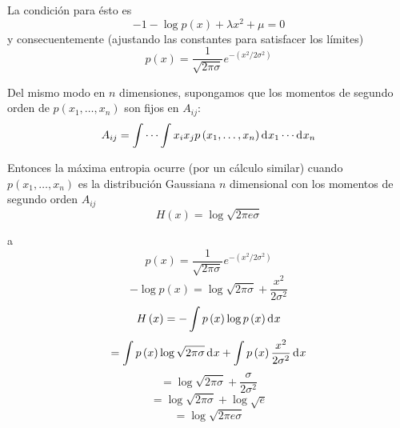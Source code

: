 La condici\'{o}n para \'{e}sto es
\begin{equation}
-1-\log p\left ( x \right )+\lambda x^{2}+\mu =0
\end{equation}
y consecuentemente (ajustando las constantes para satisfacer los l\'{i}mites)
\begin{equation}
p\left ( x \right )=\frac{1}{\sqrt{2\pi \sigma }}e^{-\left ( x^{2}/2\sigma ^{2} \right )}
\end{equation}

Del mismo modo en $n$ dimensiones, supongamos que los momentos de
segundo orden de $p\left ( x_{1}, \ldots ,x_{n} \right )$ son fijos en
$A_{ij}$:
\begin{equation}
A_{ij}=\int \cdots \int x_{i}x_{j}p\left ( x_{1}, \ldots ,x_{n} \right ) \diff x _{1}\cdots  \diff x_{n}
\end{equation}

Entonces la m\'{a}xima entropia ocurre (por un c\'{a}lculo similar)
cuando $p\left ( x_{1}, \ldots ,x_{n} \right )$ es la distribuci\'{o}n
Gaussiana $n$ dimensional con los momentos de segundo orden $A_{ij}$
\begin{equation}
H\left ( x \right )=\log \sqrt{2\pi e\sigma }
\end{equation}

a\\

\begin{equation}
p\left ( x \right )=\frac{1}{\sqrt{2\pi \sigma }}e^{-\left ( x^{2}/2\sigma ^{2} \right )}
\end{equation}
\begin{equation}
-\log p\left ( x \right )=\log \sqrt{2\pi \sigma }+\frac{x^{2}}{2\sigma ^{2}}
\end{equation}
\begin{equation}
H\left ( x \right )=-\int p\left ( x \right )\log p\left ( x \right ) \diff x 
\end{equation}
\begin{equation}
=\int p\left ( x \right )\log \sqrt{2\pi \sigma } \diff x +\int p\left ( x \right )\frac{x^{2}}{2\sigma ^{2}} \diff x 
\end{equation}
\begin{equation}
=\log \sqrt{2\pi \sigma }+\frac{\sigma }{2\sigma ^{2}}
\end{equation}
\begin{equation}
=\log \sqrt{2\pi \sigma }+\log \sqrt{e}
\end{equation}
\begin{equation}
=\log \sqrt{2\pi e \sigma }
\end{equation}

